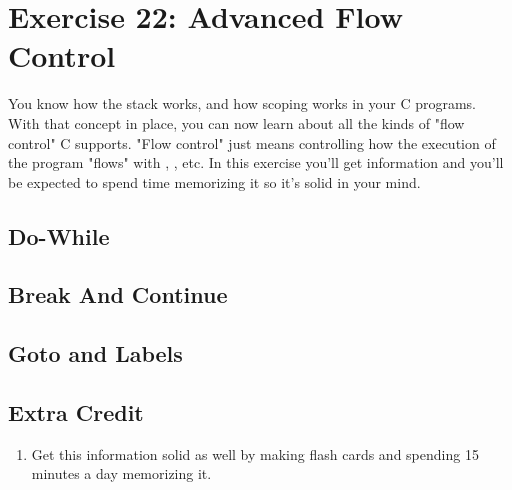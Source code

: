 \chapter{Exercise 22: Advanced Flow Control}

You know how the stack works, and how scoping works in your C programs.  With
that concept in place, you can now learn about all the kinds of "flow control"
C supports.  "Flow control" just means controlling how the execution of the
program "flows" with , , etc.  In this
exercise you'll get information and you'll be expected to spend time memorizing
it so it's solid in your mind.

\section{Do-While}

\section{Break And Continue}

\section{Goto and Labels}

\section{Extra Credit}

\begin{enumerate}
\item Get this information solid as well by making flash cards and spending 15 
    minutes a day memorizing it.
\end{enumerate}
